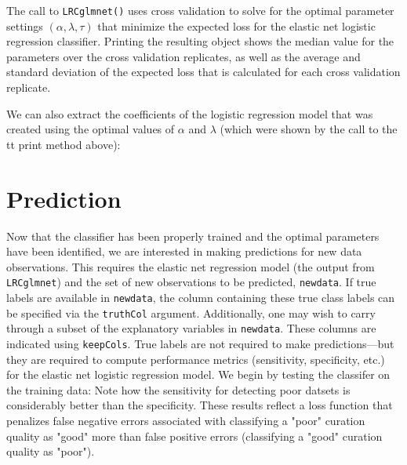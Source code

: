 \documentclass{article}
\begin{document}
\noindent The call to {\tt LRCglmnet()} uses cross validation to solve for the optimal parameter settings 
$\left(\alpha, \lambda, \tau\right)$ that minimize the expected loss for the elastic net logistic regression 
classifier. Printing the resulting object shows the median value for the parameters over the cross validation 
replicates, as well as the average and standard deviation of the expected loss that is calculated for each
cross validation replicate.
 

\noindent We can also extract the coefficients of the logistic regression model that was created using the 
optimal values of $\alpha$ and $\lambda$ (which were shown by the call to the {\\tt print} method above):

\section{Prediction}

Now that the classifier has been properly trained and the optimal parameters have been identified, we are 
interested in making predictions for new data observations. This requires the elastic net regression model 
(the output from {\tt LRCglmnet}) and the set of new observations to be predicted, {\tt newdata}.  If true labels 
are available in {\tt newdata}, the column containing these true class labels can be specified via the 
{\tt truthCol} argument. Additionally, one may wish to carry through a subset of the explanatory variables in 
{\tt newdata}.  These columns are indicated using {\tt keepCols}.   True labels are not required to make 
predictions---but they are required to compute performance metrics (sensitivity, specificity, etc.) for the 
elastic net logistic regression model. We begin by testing the classifer on the training data:
% 
% 
% 
\noindent Note how the sensitivity for detecting poor datsets is considerably better than the specificity. 
These results reflect a loss function that penalizes false negative errors associated with classifying a 
"poor" curation quality as "good" more than false positive errors (classifying a "good" curation quality 
as "poor"). 
\end{document}

